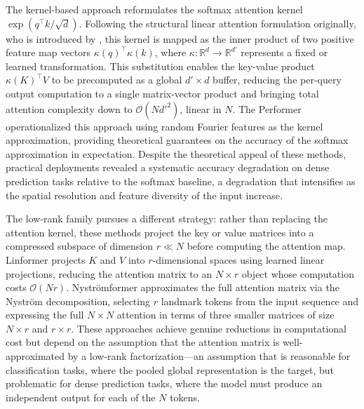 The kernel-based approach reformulates the softmax attention kernel $\exp(q^\top k / \sqrt{d})$. Following the structural linear attention formulation originally, who is introduced by \cite{Katharopoulos2020Linear}, this kernel is mapped as the inner product of two positive feature map vectors $\kappa(q)^\top \kappa(k)$, where $\kappa: \mathbb{R}^d \to \mathbb{R}^{d'}$ represents a fixed or learned transformation. This substitution enables the key-value product
$\kappa(K)^\top V$ to be precomputed as a global $d' \times d$ buffer,
reducing the per-query output computation to a single matrix-vector product
and bringing total attention complexity down to $\mathcal{O}(N {d'}^2)$,
linear in $N$. The Performer \cite{Choromanski2021Performer} operationalized
this approach using random Fourier features as the kernel approximation,
providing theoretical guarantees on the accuracy of the softmax approximation
in expectation. Despite the theoretical appeal of these methods, practical
deployments revealed a systematic accuracy degradation on dense prediction
tasks relative to the softmax baseline, a degradation that intensifies as the
spatial resolution and feature diversity of the input increase.

The low-rank family pursues a different strategy: rather than replacing the
attention kernel, these methods project the key or value matrices into a
compressed subspace of dimension $r \ll N$ before computing the attention
map. Linformer \cite{Wang2020Linformer} projects $K$ and $V$ into
$r$-dimensional spaces using learned linear projections, reducing the
attention matrix to an $N \times r$ object whose computation costs
$\mathcal{O}(Nr)$. Nystr\"{o}mformer \cite{Xiong2021Nystromformer} approximates
the full attention matrix via the Nystr\"{o}m decomposition, selecting $r$
landmark tokens from the input sequence and expressing the full $N \times N$
attention in terms of three smaller matrices of size $N \times r$ and
$r \times r$. These approaches achieve genuine reductions in computational
cost but depend on the assumption that the attention matrix is
well-approximated by a low-rank factorization---an assumption that is
reasonable for classification tasks, where the pooled global representation
is the target, but problematic for dense prediction tasks, where the model
must produce an independent output for each of the $N$ tokens.

